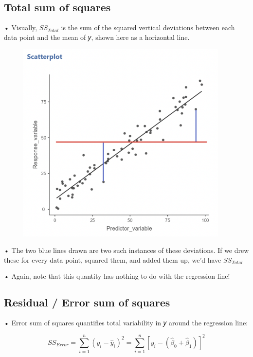 \documentclass[
  letterpaper,
  DIV=11,
  numbers=noendperiod]{scrreprt}
\begin{document}
\hypertarget{total-sum-of-squares}{%
\subsection{Total sum of squares}\label{total-sum-of-squares}}

• Visually, \(SS_{Total}\) is the sum of the squared vertical deviations
between each data point and the mean of 𝑦, shown here as a horizontal
line.

\begin{figure}

{\centering \includegraphics[width=4.16667in,height=\textheight]{images/Mod2_pt1_1.png}

}

\end{figure}

• The two blue lines drawn are two such instances of these deviations.
If we drew these for every data point, squared them, and added them up,
we'd have \(SS_{Total}\)

• Again, note that this quantity has nothing to do with the regression
line!

\hypertarget{residual-error-sum-of-squares}{%
\subsection{Residual / Error sum of
squares}\label{residual-error-sum-of-squares}}

• Error sum of squares quantifies total variability in 𝑦 around the
regression line:

\[
SS_{Error} = \sum^n_{i=1}(y_i - \hat{y}_i)^2 = \sum^n_{i=1}[y_i - (\hat{\beta}_0 + \hat{\beta}_1)]^2
\]
\end{document}
